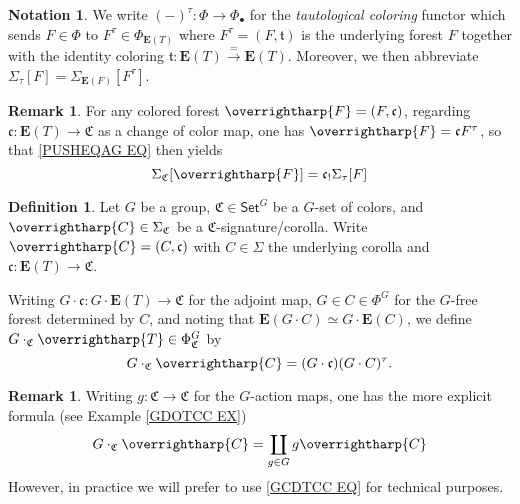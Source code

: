 \documentclass[a4paper,10pt
,draft
]{article}%
\numberwithin{equation}{section}
\numberwithin{figure}{section}
\theoremstyle{definition} %
\newtheorem{definition}[equation]{Definition}%
\newtheorem{remark}[equation]{Remark}%
\newtheorem{notation}[equation]{Notation}%
\newcommand{\vect}[1]{\text{\overrightharp{\ensuremath{#1}}}}
\newcommand{\1}{\ensuremath{\mathbbm 1}}%
\begin{document}
\begin{notation}
We write $(-)^{\tau} \colon \Phi \to \Phi_{\bullet}$
for the \emph{tautological coloring} functor
which sends $F \in \Phi$ to 
$F^{\tau} \in \Phi_{\boldsymbol{E}(T)}$
where
$F^{\tau} = (F,\mathfrak{t})$ is the underlying forest $F$
together with the identity coloring
$\mathfrak{t} \colon \boldsymbol{E}(T) \xrightarrow{=} \boldsymbol{E}(T)$.
Moreover, we then abbreviate 
$\Sigma_{\tau}[F] = \Sigma_{\boldsymbol{E}(F)}[F^{\tau}]$.
\end{notation}


\begin{remark}
For any colored forest $\vect{F}=(F,\mathfrak{c})$,
regarding $\mathfrak{c} \colon \boldsymbol{E}(T) \to \mathfrak{C}$
as a change of color map, 
one has $\vect{F} = \mathfrak{c} F^{\tau}$,
so that \eqref{PUSHEQAG EQ} then yields 
\begin{equation}\label{CANPUSH EQ}
\Sigma_{\mathfrak{C}}[\vect{F}] = 
\mathfrak{c}_! \Sigma_{\tau}[F]
\end{equation}
\end{remark}


\begin{definition}
Let $G$ be a group,
$\mathfrak{C} \in \mathsf{Set}^G$
be a $G$-set of colors, 
and $\vect{C} \in \Sigma_{\mathfrak{C}}$ be a $\mathfrak{C}$-signature/corolla.
Write
$\vect{C} = (C,\mathfrak{c})$
with $C\in \Sigma$ the underlying corolla
and 
$\mathfrak{c} \colon \boldsymbol{E}(T) \to \mathfrak{C}$.

Writing 
$G \cdot \mathfrak{c} \colon G \cdot \boldsymbol{E}(T) \to \mathfrak{C}$
for the adjoint map, 
$G \in C \in \Phi^G$
for the $G$-free forest determined by $C$,
and noting that
$\boldsymbol{E}(G \cdot C) \simeq 
G \cdot \boldsymbol{E}(C)$,
we define $G \cdot_{\mathfrak{C}} \vect{T} \in \Phi^G_{\mathfrak{C}}$ by
\begin{equation}\label{GCDTCC EQ}
G \cdot_{\mathfrak{C}} \vect{C} = 
(G \cdot \mathfrak{c})(G \cdot C)^{\tau}.
\end{equation}
\end{definition}



\begin{remark}
Writing $g \colon \mathfrak{C} \to \mathfrak{C}$
for the $G$-action maps,
one has the more explicit formula 
(see Example \ref{GDOTCC EX})
\[
G \cdot_{\mathfrak{C}} \vect{C}
= 
\coprod_{g \in G}
g \vect{C}
\]
However, in practice we will prefer to use 
\eqref{GCDTCC EQ} for technical purposes.
\end{remark}
\end{document}
